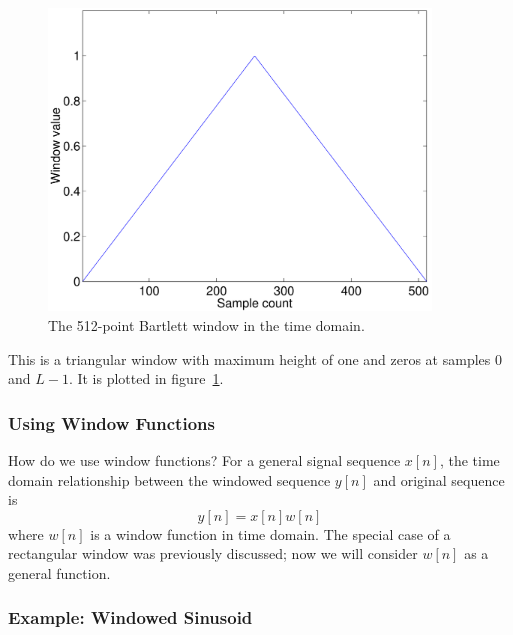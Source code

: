 \begin{figure}
\centerline{\includegraphics[width=4in]{ch-fft/ufft_bartlett_w512}}
\caption{The 512-point Bartlett window in the time
domain.\label{fig:ufft-baw}}
\end{figure}
 
This is a triangular window with maximum height of one and zeros at
samples 0 and $L-1$. It is plotted in figure~\ref{fig:ufft-baw}.

\subsubsection{Using Window Functions}

How do we use window functions? For a general signal sequence $x[n]$,
the time domain relationship between the windowed sequence $y[n]$ and
original sequence is
\begin{equation}
y[n] = x[n] w[n]
\label{eq:ufft-gw}
\end{equation}
where $w[n]$ is a window function in time domain. The special case of
a rectangular window was previously discussed; now we will consider
$w[n]$ as a general function.

\subsubsection{Example: Windowed Sinusoid}

